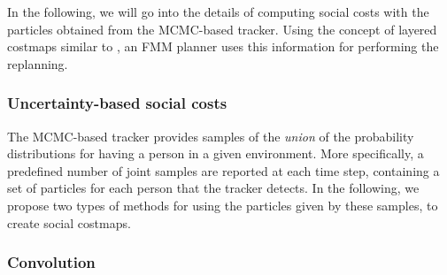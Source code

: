In the following, we will go into the details of computing social costs with the particles obtained from the MCMC-based tracker. Using the concept of layered costmaps similar to \cite{lu2014iros}, an FMM planner uses this information for performing the replanning.%
\subsubsection{Uncertainty-based social costs}

The MCMC-based tracker provides samples of the \textit{union} of the probability distributions for having a person in a given environment. More specifically, a predefined number of joint samples are reported at each time step, containing a set of particles for each person that the tracker detects. In the following, we propose two types of methods for using the particles given by these samples, to create social costmaps.  


\subsubsection*{\normalfont \textbf{Convolution}}

